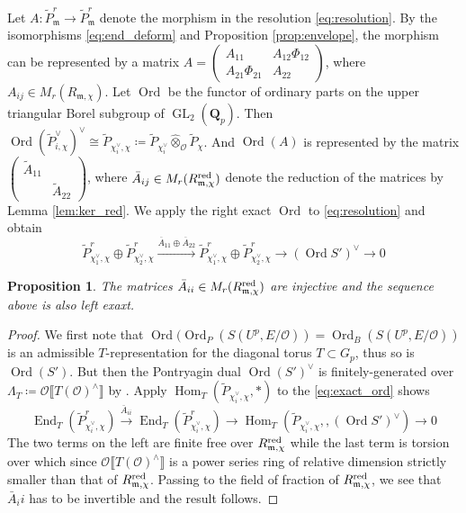 \documentclass[leqno]{amsart}
\newtheorem{prop}[thm]{Proposition}
\theoremstyle{definition}
\theoremstyle{remark}
\newcommand{\smat}[1]{\left(\begin{smallmatrix} #1 \end{smallmatrix}\right)}
\newcommand{\oo}{\mathcal{O}}
\newcommand{\Qp}{\mathbf{Q}_p}
\newcommand{\A}{\mathbf A}
\DeclareMathOperator{\End}{End}
\DeclareMathOperator{\Hom}{Hom}
\DeclareMathOperator{\GL}{GL}
\newcommand{\fm}{\mathfrak{m}}
\DeclareMathOperator{\Ord}{Ord} %
\newcommand{\red}{\textnormal{red}}
\begin{document}
Let $A\colon \tilde{P}_\fm^r\to \tilde{P}_\fm^r$ 
denote the morphism
in the  resolution \eqref{eq:resolution}.
By the isomorphisms \eqref{eq:end_deform}
and Proposition \ref{prop:envelope},
the morphism 
can be represented by a matrix
$A=\smat{A_{11} & A_{12}\Phi_{12}\\A_{21}\Phi_{21} & A_{22}}$,
where $A_{ij}\in M_r(R_{\fm,\chi})$.
Let $\Ord$ be the functor of ordinary parts
on the upper triangular Borel subgroup of  $\GL_2(\Qp)$.
Then  
$\Ord(\tilde{P}_{i,\chi}^\vee)^\vee\cong 
\tilde{P}_{\chi_i^\vee,\chi}\coloneqq 
\tilde{P}_{\chi_i^\vee}\hat{\otimes}_{\oo}
\tilde{P}_\chi$.
And $\Ord(A)$
is represented by the matrix
$\smat{\tilde{A}_{11} & \\& \tilde{A}_{22}}$,
where $\bar{A}_{ij}\in M_r(R^{\red}_{\fm,\chi})$ denote 
the reduction of the matrices by Lemma \ref{lem:ker_red}.
We apply the right exact $\Ord$ to 
\eqref{eq:resolution} and obtain
\begin{equation}\label{eq:exact_ord}
	\tilde{P}_{\chi_1^\vee,\chi}^r\oplus 
	\tilde{P}_{\chi_2^\vee,\chi}^r
	\xrightarrow{\overline{A}_{11}\oplus\overline{A}_{22}}
	\tilde{P}_{\chi_1^\vee,\chi}^r\oplus 
	\tilde{P}_{\chi_2^\vee,\chi}^r
	\to (\Ord S')^\vee\to 0
\end{equation}


\begin{prop}    
	The matrices 
	$\bar{A}_{ii}\in M_r(R^{\red}_{\fm,\chi})$
	are injective and the sequence above 
	is also left exaxt.
\end{prop}
\begin{proof}
	We first note that 
	$\Ord(\Ord_P(S(U^p,E/\oo))=\Ord_B(S(U^p,E/\oo))$
	is an admissible $T$-representation
	for the diagonal torus $T\subset G_p$,
	thus so is $\Ord(S')$.
	But then the Pontryagin dual 
	$\Ord(S')^\vee$ is finitely-generated
	over  $\Lambda_T\coloneqq
	\oo\llbracket T(\oo)^{\wedge}\rrbracket$
	by \cite[Lem 2.2.11]{emeI}.
	Apply $\Hom_{T}(\tilde{P}_{\chi_i^\vee,\chi},*)$
	to the \eqref{eq:exact_ord} shows
\begin{equation*}
	\End_{T}(\tilde{P}_{\chi_i^\vee,\chi}^r)\xrightarrow{\bar{A}_{ii}}
	\End_{T}(\tilde{P}_{\chi_i^\vee,\chi}^r)\to 
	\Hom_{T}(\tilde{P}_{\chi_i^\vee,\chi}, ,(\Ord S')^\vee)
	\to 0
\end{equation*}
	The two terms on the left 
	are finite free over $R_{\fm,\chi}^{\red}$
	while the last term is torsion over which
	since $\oo\llbracket T(\oo)^{\wedge}\rrbracket$
	is a power series ring of relative dimension
	strictly smaller than that of $R_{\fm,\chi}^{\red}$.
	Passing to the field of fraction of $R_{\fm,\chi}^{\red}$,
	we see that $\bar{A}_ii$ has to be invertible
	and the result follows.
\end{proof}
\end{document}
